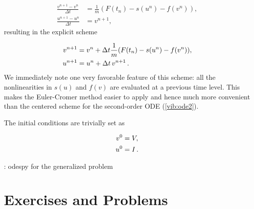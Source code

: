 \documentclass[%
oneside,                 %
final,                   %
10pt]{article}
\newcommand{\shortinlinecomment}[3]{{\color{red}{\bf #1}: #2}}
\begin{document}
\begin{align}
\frac{v^{n+1}-v^n}{\Delta t} &= \frac{1}{m}(F(t_n)-s(u^n)-f(v^n)),
\label{vib:ode2:EulerCromer:dveq0a}\\ 
\frac{u^{n+1}-u^n}{\Delta t} &= v^{n+1},
\label{vib:ode2:EulerCromer:dueq0a}
\end{align}
resulting in the explicit scheme

\begin{align}
v^{n+1} &= v^n + \Delta t\frac{1}{m}(F(t_n)-s(u^n)-f(v^n)),
\label{vib:ode2:EulerCromer:dveq}\\ 
u^{n+1} &= u^n + \Delta t\,v^{n+1}\tp
\label{vib:ode2:EulerCromer:dueq0}
\end{align}
We immediately note one very favorable feature of this scheme: all the
nonlinearities in $s(u)$ and $f(v)$ are evaluated at a previous time
level. This makes the Euler-Cromer method easier to apply and
hence much more convenient than the centered scheme for the second-order
ODE (\ref{vib:ode2}).

The initial conditions are trivially set as

\begin{align}
v^0 &= V,\\ 
u^0 &= I\tp
\end{align}

\shortinlinecomment{hpl 9}{ odespy for the generalized problem }{ odespy for the generalized }

\section{Exercises and Problems}
\end{document}
